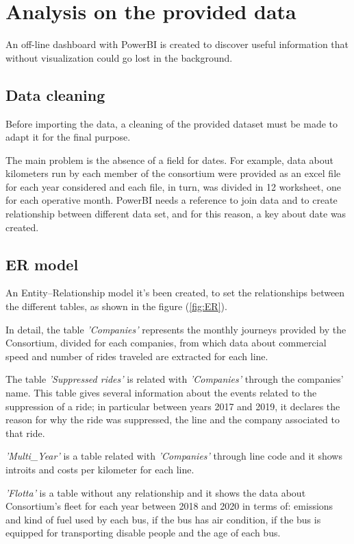 \chapter{Analysis on the provided data}
\label{ch:dashboard}
An off-line dashboard with PowerBI is created to discover useful information that without visualization could go lost in the background.

\section{Data cleaning}
Before importing the data, a cleaning of the provided dataset must be made to adapt it for the final purpose. 

The main problem is the absence of a field for dates. For example, data about kilometers run by each member of the consortium were provided as an excel file for each year considered and each file, in turn, was divided in 12 worksheet, one for each operative month. PowerBI needs a reference to join data and to create relationship between different data set, and for this reason, a key about date was created.  


\section{ER model}
An Entity–Relationship model it's been created, to set the relationships between the different tables, as shown in the figure (\ref{fig:ER}).

In detail, the table \textit{'Companies'} represents the monthly journeys provided by the Consortium, divided for each companies, from which data about commercial speed and number of rides traveled are extracted for each line. 

The table \textit{'Suppressed rides'} is related with \textit{'Companies'} through the companies' name. This table gives several information about the events related to the suppression of a ride; in particular between years 2017 and 2019, it declares the reason for why the ride was suppressed, the line and the company associated to that ride. 

\textit{'Multi\_Year'} is a table related with \textit{'Companies'} through line code and it shows introits and costs per kilometer for each line. 

\textit{'Flotta'} is a table without any relationship and it shows the data about Consortium's fleet for each year between 2018 and 2020 in terms of: emissions and kind of fuel used by each bus, if the bus has air condition, if the bus is equipped for transporting disable people and the age of each bus.


